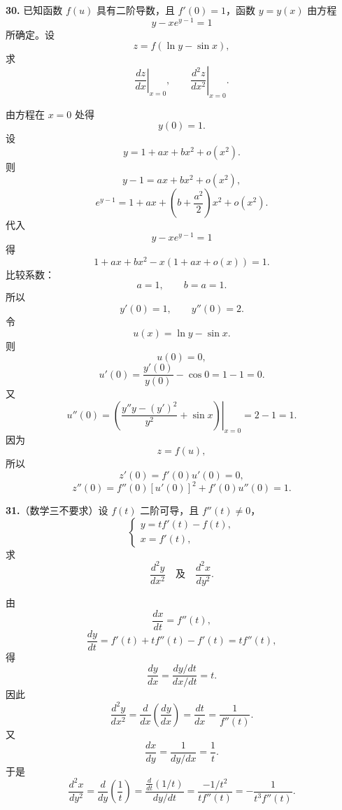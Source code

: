 \begin{problemblock}
\textbf{30.} 已知函数 \(f(u)\) 具有二阶导数，且 \(f'(0)=1\)，函数 \(y=y(x)\) 由方程
\[
y-xe^{y-1}=1
\]
所确定。设
\[
z=f(\ln y-\sin x),
\]
求
\[
\left.\frac{dz}{dx}\right|_{x=0},\qquad
\left.\frac{d^2z}{dx^2}\right|_{x=0}.
\]
\end{problemblock}

\begin{solutionblock}
由方程在 \(x=0\) 处得
\[
y(0)=1.
\]
设
\[
y=1+ax+bx^2+o(x^2).
\]
则
\[
y-1=ax+bx^2+o(x^2),
\]
\[
e^{y-1}=1+ax+\left(b+\frac{a^2}{2}\right)x^2+o(x^2).
\]
代入
\[
y-xe^{y-1}=1
\]
得
\[
1+ax+bx^2-x(1+ax+o(x))=1.
\]
比较系数：
\[
a=1,\qquad b=a=1.
\]
所以
\[
y'(0)=1,\qquad y''(0)=2.
\]
令
\[
u(x)=\ln y-\sin x.
\]
则
\[
u(0)=0,
\]
\[
u'(0)=\frac{y'(0)}{y(0)}-\cos0=1-1=0.
\]
又
\[
u''(0)=\left.\left(\frac{y''y-(y')^2}{y^2}+\sin x\right)\right|_{x=0}
=2-1=1.
\]
因为
\[
z=f(u),
\]
所以
\[
z'(0)=f'(0)u'(0)=0,
\]
\[
z''(0)=f''(0)[u'(0)]^2+f'(0)u''(0)=1.
\]
\end{solutionblock}

\begin{problemblock}
\textbf{31.}（数学三不要求）设 \(f(t)\) 二阶可导，且 \(f''(t)\ne0\)，
\[
\begin{cases}
y=tf'(t)-f(t),\\
x=f'(t),
\end{cases}
\]
求
\[
\frac{d^2y}{dx^2}\quad\text{及}\quad \frac{d^2x}{dy^2}.
\]
\end{problemblock}

\begin{solutionblock}
由
\[
\frac{dx}{dt}=f''(t),
\]
\[
\frac{dy}{dt}=f'(t)+tf''(t)-f'(t)=tf''(t),
\]
得
\[
\frac{dy}{dx}=\frac{dy/dt}{dx/dt}=t.
\]
因此
\[
\frac{d^2y}{dx^2}
=\frac{d}{dx}\left(\frac{dy}{dx}\right)
=\frac{dt}{dx}
=\frac1{f''(t)}.
\]
又
\[
\frac{dx}{dy}=\frac1{dy/dx}=\frac1t.
\]
于是
\[
\frac{d^2x}{dy^2}
=\frac{d}{dy}\left(\frac1t\right)
=\frac{\frac{d}{dt}(1/t)}{dy/dt}
=\frac{-1/t^2}{tf''(t)}
=-\frac1{t^3f''(t)}.
\]
\end{solutionblock}


